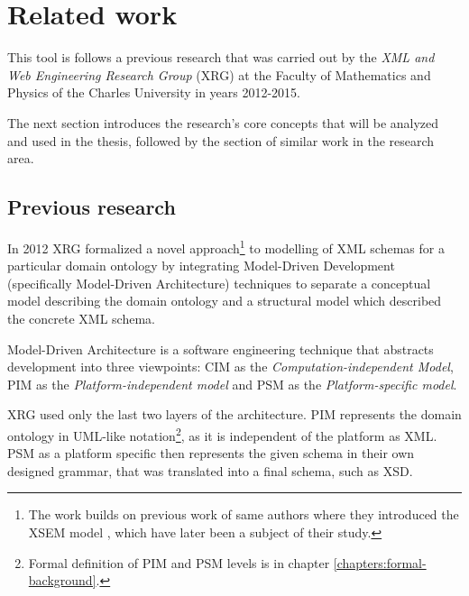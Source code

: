 \chapter{Related work}
\label{chapters:related-work}

This tool is follows a previous research that was carried out by the \textit{XML and Web Engineering Research Group} (XRG) at the Faculty of Mathematics and Physics of the Charles University  in years 2012-2015.

The next section introduces the research's core concepts that will be analyzed and used in the thesis, followed by the section of similar work in the research area.

\section{Previous research}

In 2012 XRG formalized a novel approach\footnote{The work builds on previous work of same authors where they introduced the XSEM model \cite{necasky2007xsem}, which have later been a subject of their study.} to modelling of XML schemas \cite{necasky2012conceptual} for a particular domain ontology by integrating Model-Driven Development (specifically Model-Driven Architecture) techniques to separate a conceptual model describing the domain ontology and a structural model which described the concrete XML schema.

Model-Driven Architecture is a software engineering technique that abstracts development into three viewpoints: CIM as the \textit{Computation-independent Model}, PIM as the \textit{Platform-independent model} and PSM as the \textit{Platform-specific model}.

XRG used only the last two layers of the architecture. PIM represents the domain ontology in UML-like notation\footnote{Formal definition of PIM and PSM levels is in chapter \ref{chapters:formal-background}.}, as it is independent of the platform as XML. PSM as a platform specific then represents the given schema in their own designed grammar, that was translated into a final schema, such as XSD.

